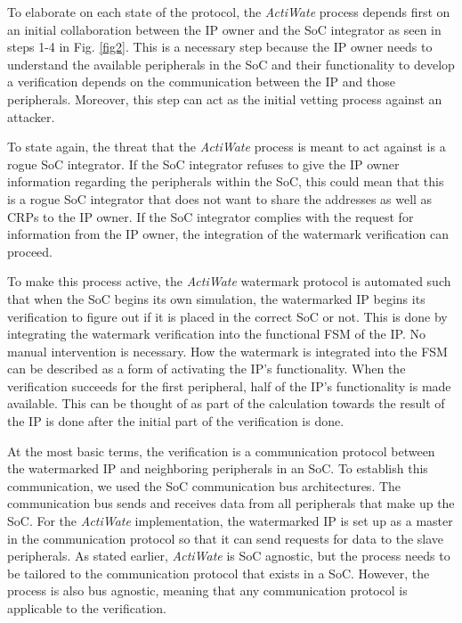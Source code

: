 \documentclass[onecolumn]{IEEEtran}
\begin{document}
To elaborate on each state of the protocol, the \textit{ActiWate} process
depends first on an initial collaboration between the IP owner and the
SoC integrator as seen in steps 1-4 in Fig. \ref{fig2}. This is a necessary step
because the IP owner needs to understand the available peripherals in
the SoC and their functionality to develop a verification depends on
the communication between the IP and those peripherals. Moreover,
this step can act as the initial vetting process against an attacker.

To state again, the threat that the \textit{ActiWate} process is meant to act
against is a rogue SoC integrator. If the SoC integrator refuses to
give the IP owner information regarding the peripherals within the
SoC, this could mean that this is a rogue SoC integrator that does not
want to share the addresses as well as CRPs to the IP owner. If the
SoC integrator complies with the request for information from the IP
owner, the integration of the watermark verification can proceed.

To make this process active, the \textit{ActiWate} watermark protocol is
automated such that when the SoC begins its own simulation, the
watermarked IP begins its verification to figure out if it is placed
in the correct SoC or not. This is done by integrating the watermark
verification into the functional FSM of the IP. No manual intervention
is necessary. How the watermark is integrated into the FSM can
be described as a form of activating the IP’s functionality. When
the verification succeeds for the first peripheral, half of the IP’s
functionality is made available. This can be thought of as part of
the calculation towards the result of the IP is done after the initial
part of the verification is done.

At the most basic terms, the verification is a communication
protocol between the watermarked IP and neighboring peripherals
in an SoC. To establish this communication, we used the SoC
communication bus architectures. The communication bus sends and
receives data from all peripherals that make up the SoC. For the
\textit{ActiWate} implementation, the watermarked IP is set up as a master
in the communication protocol so that it can send requests for data to
the slave peripherals. As stated earlier, \textit{ActiWate} is SoC agnostic, but
the process needs to be tailored to the communication protocol that
exists in a SoC. However, the process is also bus agnostic, meaning
that any communication protocol is applicable to the verification.
\end{document}
